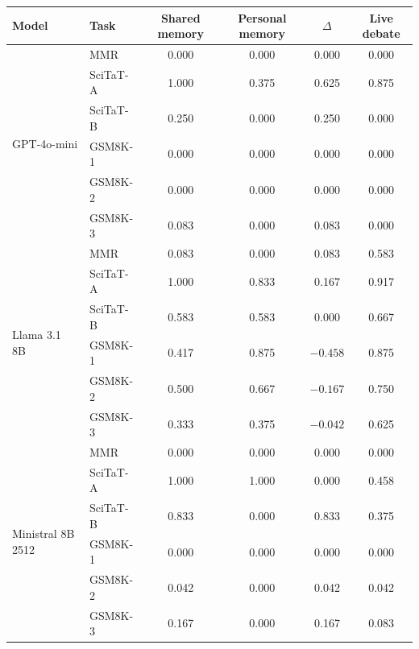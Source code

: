 \begin{fixedtable}
\caption{Per-task results underlying Table~\ref{tab:neutral_open_multitask_summary}. SciTaT-A is 1512.01642 q2 and SciTaT-B is math 0012242 q2. Every row contains 12 balanced speaking orders per protocol.}
\label{tab:neutral_open_multitask}
\begin{center}
\scriptsize
\setlength{\tabcolsep}{3.5pt}
\begin{tabular}{llcccc}
\toprule
Model & Task & Shared memory & Personal memory & $\Delta$ & Live debate \\
\midrule
\multirow{6}{*}{GPT-4o-mini}
& MMR & 0.000 & 0.000 & 0.000 & 0.000 \\
& SciTaT-A & 1.000 & 0.375 & 0.625 & 0.875 \\
& SciTaT-B & 0.250 & 0.000 & 0.250 & 0.000 \\
& GSM8K-1 & 0.000 & 0.000 & 0.000 & 0.000 \\
& GSM8K-2 & 0.000 & 0.000 & 0.000 & 0.000 \\
& GSM8K-3 & 0.083 & 0.000 & 0.083 & 0.000 \\
\midrule
\multirow{6}{*}{Llama 3.1 8B}
& MMR & 0.083 & 0.000 & 0.083 & 0.583 \\
& SciTaT-A & 1.000 & 0.833 & 0.167 & 0.917 \\
& SciTaT-B & 0.583 & 0.583 & 0.000 & 0.667 \\
& GSM8K-1 & 0.417 & 0.875 & $-0.458$ & 0.875 \\
& GSM8K-2 & 0.500 & 0.667 & $-0.167$ & 0.750 \\
& GSM8K-3 & 0.333 & 0.375 & $-0.042$ & 0.625 \\
\midrule
\multirow{6}{*}{Ministral 8B 2512}
& MMR & 0.000 & 0.000 & 0.000 & 0.000 \\
& SciTaT-A & 1.000 & 1.000 & 0.000 & 0.458 \\
& SciTaT-B & 0.833 & 0.000 & 0.833 & 0.375 \\
& GSM8K-1 & 0.000 & 0.000 & 0.000 & 0.000 \\
& GSM8K-2 & 0.042 & 0.000 & 0.042 & 0.042 \\
& GSM8K-3 & 0.167 & 0.000 & 0.167 & 0.083 \\
\bottomrule
\end{tabular}
\end{center}
\end{fixedtable}

